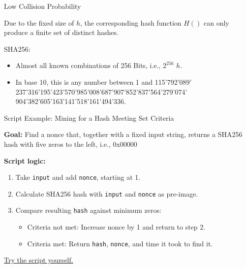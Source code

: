 \documentclass[]{beamer}
\begin{document}
\begin{frame}{Low Collision Probability}

Due to the fixed size of $h$, the corresponding hash function $H()$ can only produce a finite set of distinct hashes.
\vspace{1em}

SHA256:
	\begin{itemize}
		\item Almost all known combinations of 256 Bits, i.e.,  $2^{256}$ $h$.
		\item In base 10, this is any number between 1 and 115'792'089' 237'316'195'423'570'985'008'687'907’852'837'564'279'074' 904'382'605'163'141'518'161'494'336.
	\end{itemize}
\vspace{1em}


	
\end{frame}

\begin{frame}{Script Example: Mining for a Hash Meeting Set Criteria}

\textbf{Goal:} Find a nonce that, together with a fixed input string, returns a SHA256 hash with five zeros to the left, i.e., 0x00000

\vspace{1em}

\textbf{Script logic:}
\begin{enumerate}
	\item Take \texttt{input} and add \texttt{nonce}, starting at 1.
	\item Calculate SHA256 hash with \texttt{input} and \texttt{nonce} as pre-image.
	\item Compare resulting \texttt{hash} against minimum zeros:
	\begin{itemize}
		\item Criteria not met: Increase nonce by 1 and  return to step 2.
		\item Criteria met: Return \texttt{hash}, \texttt{nonce}, and time it took to find it.
	\end{itemize} 
\end{enumerate}

\vspace{1em}

\color{focus} \link \href {}{Try the script yourself.}
	
\end{frame}
\end{document}
